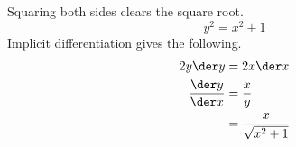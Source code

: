 Squaring both sides clears the square root.
\begin{equation*}
  y^2 = x^2+1
\end{equation*}
Implicit differentiation gives the following.
\begin{align*}
  2y\der y & = 2 x\der x \\
  \frac{\der y}{\der x} &= \frac{x}{y} \\
            &= \frac{x}{\sqrt{x^2+1}}
\end{align*}

